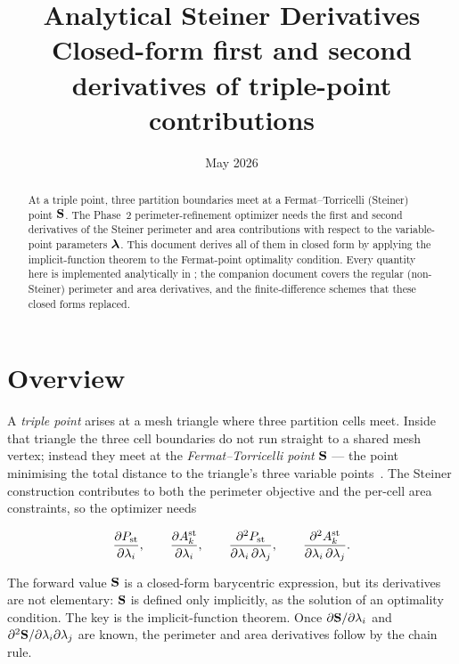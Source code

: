 \documentclass[11pt,a4paper]{article}
\title{\textbf{Analytical Steiner Derivatives}\\[0.5em]
  \large Closed-form first and second derivatives of triple-point contributions}
\author{}
\date{May 2026}
\begin{document}
\maketitle

\begin{abstract}
At a triple point, three partition boundaries meet at a Fermat--Torricelli
(Steiner) point $\mathbf{S}$.  The Phase~2 perimeter-refinement optimizer needs the
first and second derivatives of the Steiner perimeter and area contributions
with respect to the variable-point parameters $\boldsymbol{\lambda}$.  This document derives
all of them in closed form by applying the implicit-function theorem to the
Fermat-point optimality condition.  Every quantity here is implemented
analytically in ; the companion
document  covers the regular
(non-Steiner) perimeter and area derivatives, and the finite-difference
schemes that these closed forms replaced.
\end{abstract}

\tableofcontents
\newpage

\section{Overview}

A \emph{triple point} arises at a mesh triangle where three partition cells
meet.  Inside that triangle the three cell boundaries do not run straight to a
shared mesh vertex; instead they meet at the \emph{Fermat--Torricelli point}
$\mathbf{S}$ --- the point minimising the total distance to the triangle's three
variable points~\cite{kuhn1974steiner}.  The Steiner construction contributes
to both the perimeter objective and the per-cell area constraints, so the
optimizer needs

\begin{equation}
  \dfrac{\partial P_{\mathrm{st}}}{\partial \lambda_i},\qquad
  \dfrac{\partial A^{\mathrm{st}}_k}{\partial \lambda_i},\qquad
  \dfrac{\partial^2 P_{\mathrm{st}}}{\partial \lambda_i\,\partial \lambda_j},\qquad
  \dfrac{\partial^2 A^{\mathrm{st}}_k}{\partial \lambda_i\,\partial \lambda_j}.
\end{equation}

The forward value $\mathbf{S}$ is a closed-form barycentric expression, but its
derivatives are not elementary: $\mathbf{S}$ is defined only implicitly, as the
solution of an optimality condition.  The key is the implicit-function
theorem.  Once $\partial\mathbf{S}/\partial\lambda_i$ and
$\partial^2\mathbf{S}/\partial\lambda_i\partial\lambda_j$ are known, the perimeter and area
derivatives follow by the chain rule.
\end{document}
